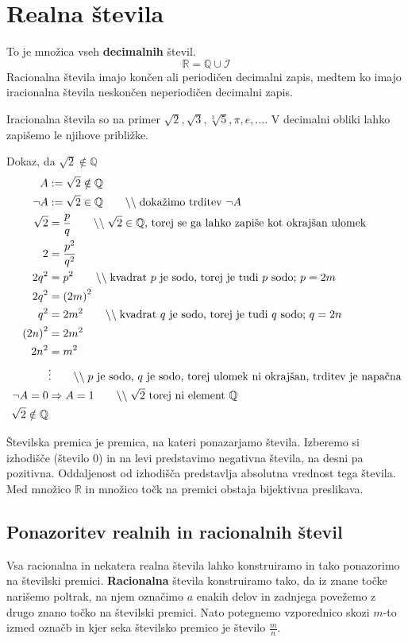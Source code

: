 \documentclass[a4paper,oneside,12pt,fleqn]{article}
\def\R{\ensuremath{\mathbb R}}
\def\Q{\ensuremath{\mathbb Q}}
\newcommand{\comment}[1]{\ensuremath{\qquad\backslash\backslash\;}\textnormal{#1}}
\numberwithin{equation}{section}
\begin{document}
\section{Realna števila}
To je množica vseh \textbf{decimalnih} števil.
\[ \R = \Q \cup \mathcal I \]
Racionalna števila imajo končen ali periodičen decimalni zapis, medtem ko imajo iracionalna števila
neskončen neperiodičen decimalni zapis.

Iracionalna števila so na primer $\sqrt{2}, \sqrt{3}, \sqrt[3]{5}, \pi, e, \ldots$. V decimalni
obliki lahko zapišemo le njihove približke.

Dokaz, da $\sqrt{2} \notin \Q$
\begin{align*}
  A &:= \sqrt{2} \notin \Q \\
  \neg A &:= \sqrt{2} \in \Q  \comment{dokažimo trditev $\neg A$} \\
  \sqrt{2} &=  \frac{p}{q} \comment{$\sqrt{2} \in \Q$, torej se ga lahko zapiše kot okrajšan ulomek} \\
  2 &= \frac{p^2}{q^2} \\
  2q^2 &= p^2 \comment{kvadrat $p$ je sodo, torej je tudi $p$ sodo; $p = 2m$} \\
  2q^2 &= \left( 2m \right)^2 \\
  q^2 &= 2m^2 \comment{kvadrat $q$ je sodo, torej je tudi $q$ sodo; $q = 2n$} \\
  \left( 2n \right)^2 &=  2m^2 \\
  2n^2 &= m^2 \\
  &\vdots \comment{$p$ je sodo, $q$ je sodo, torej ulomek ni okrajšan, trditev je napačna} \\
  \neg A = 0 &\Rightarrow A = 1 \comment{$\sqrt{2}$ torej ni element \Q} \\
  \sqrt{2} \notin \Q
\end{align*}

Številska premica je premica, na kateri ponazarjamo števila. Izberemo si izhodišče (število 0) in na levi
predstavimo negativna števila, na desni pa pozitivna. Oddaljenost od izhodišča predstavlja absolutna
vrednost tega števila. Med množico \R{} in množico točk na premici obstaja bijektivna preslikava.

\subsection{Ponazoritev realnih in racionalnih števil}
Vsa racionalna in nekatera realna števila lahko konstruiramo in tako ponazorimo na številski
premici. \textbf{Racionalna} števila konstruiramo tako, da iz znane točke narišemo poltrak, na njem označimo
$a$ enakih delov in zadnjega povežemo z drugo znano točko na številski premici. Nato potegnemo
vzporednico skozi $m$-to izmed označb in kjer seka številsko premico je število $\frac{m}{n}$.
\end{document}
